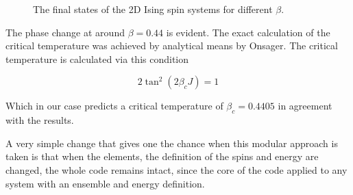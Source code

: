\begin{figure}[ht]

\label{fig:ising_states}
\caption{The final states of the 2D Ising spin systems for different $ \beta $.}
\end{figure}


The phase change at around $ \beta= 0.44 $ is evident. The exact calculation of the critical temperature was achieved by analytical means by Onsager. \cite{onsager} The critical temperature is calculated via this condition

 \begin{equation}
 2 \tan^2 \left( 2\beta_c J \right) = 1
  \end{equation}
  
Which in our case predicts a critical temperature of $ \beta_c = 0.4405 $ in agreement with the results. 

A very simple change that gives one the chance when this modular approach is taken is that when the elements, the definition of the spins and energy are changed, the whole code remains intact, since the core of the code applied to any system with an ensemble and energy definition. 

